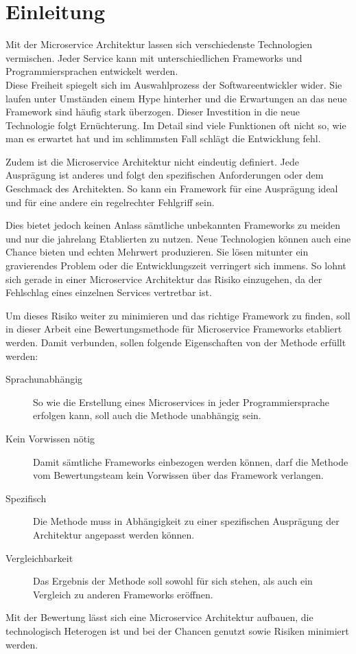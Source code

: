 \section{Einleitung}

Mit der Microservice Architektur lassen sich verschiedenste Technologien vermischen. Jeder Service kann mit unterschiedlichen Frameworks und Programmiersprachen entwickelt werden.\\
Diese Freiheit spiegelt sich im Auswahlprozess der Softwareentwickler wider. Sie laufen unter Umständen einem Hype hinterher\cite{HDD2016} und die Erwartungen an das neue Framework sind häufig stark überzogen. Dieser Investition in die neue Technologie folgt Ernüchterung. Im Detail sind viele Funktionen oft nicht so, wie man es erwartet hat und im schlimmsten Fall schlägt die Entwicklung fehl.

Zudem ist die Microservice Architektur nicht eindeutig definiert\cite[11]{Wolff2015}. Jede Ausprägung ist anderes und folgt den spezifischen Anforderungen oder dem Geschmack des Architekten. So kann ein Framework für eine Ausprägung ideal und für eine andere ein regelrechter Fehlgriff sein. 

Dies bietet jedoch keinen Anlass sämtliche unbekannten Frameworks zu meiden und nur die jahrelang Etablierten zu nutzen. Neue Technologien können auch eine Chance bieten und echten Mehrwert produzieren. Sie lösen mitunter ein gravierendes Problem oder die Entwicklungszeit verringert sich immens. So lohnt sich gerade in einer Microservice Architektur das Risiko einzugehen, da der Fehlschlag eines einzelnen Services vertretbar ist.

Um dieses Risiko weiter zu minimieren und das richtige Framework zu finden, soll in dieser Arbeit eine Bewertungsmethode für Microservice Frameworks etabliert werden. Damit verbunden, sollen folgende Eigenschaften von der Methode erfüllt werden:

\begin{description}
	\item[Sprachunabhängig] 
	So wie die Erstellung eines Microservices in jeder Programmiersprache erfolgen kann, soll auch die Methode unabhängig sein.
	\item[Kein Vorwissen nötig] 
	Damit sämtliche Frameworks einbezogen werden können, darf die Methode vom Bewertungsteam kein Vorwissen über das Framework verlangen.
	\item[Spezifisch] 
	Die Methode muss in Abhängigkeit zu einer spezifischen Ausprägung der Architektur angepasst werden können.
	\item[Vergleichbarkeit] 
	Das Ergebnis der Methode soll sowohl für sich stehen, als auch ein Vergleich zu anderen Frameworks eröffnen.
\end{description}

Mit der Bewertung lässt sich eine Microservice Architektur aufbauen, die technologisch Heterogen ist und bei der Chancen genutzt sowie Risiken minimiert werden.